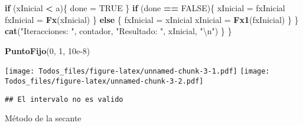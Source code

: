 \documentclass[]{article}
\newenvironment{Shaded}{\begin{snugshade}}{\end{snugshade}}
\newcommand{\CharTok}[1]{\textcolor[rgb]{0.31,0.60,0.02}{#1}}
\newcommand{\ControlFlowTok}[1]{\textcolor[rgb]{0.13,0.29,0.53}{\textbf{#1}}}
\newcommand{\DecValTok}[1]{\textcolor[rgb]{0.00,0.00,0.81}{#1}}
\newcommand{\FloatTok}[1]{\textcolor[rgb]{0.00,0.00,0.81}{#1}}
\newcommand{\KeywordTok}[1]{\textcolor[rgb]{0.13,0.29,0.53}{\textbf{#1}}}
\newcommand{\NormalTok}[1]{#1}
\newcommand{\OperatorTok}[1]{\textcolor[rgb]{0.81,0.36,0.00}{\textbf{#1}}}
\newcommand{\OtherTok}[1]{\textcolor[rgb]{0.56,0.35,0.01}{#1}}
\newcommand{\StringTok}[1]{\textcolor[rgb]{0.31,0.60,0.02}{#1}}
\begin{document}
\begin{Shaded}
\begin{Highlighting}[]
      \ControlFlowTok{if}\NormalTok{ (xInicial }\OperatorTok{<}\StringTok{ }\NormalTok{a)\{}
\NormalTok{        done =}\StringTok{ }\OtherTok{TRUE}
\NormalTok{      \}}
      \ControlFlowTok{if}\NormalTok{ (done }\OperatorTok{==}\StringTok{ }\OtherTok{FALSE}\NormalTok{)\{}
\NormalTok{        xInicial =}\StringTok{ }\NormalTok{fxInicial}
\NormalTok{        fxInicial =}\StringTok{ }\KeywordTok{Fx}\NormalTok{(xInicial)}
\NormalTok{      \} }\ControlFlowTok{else}\NormalTok{ \{}
\NormalTok{        fxInicial =}\StringTok{ }\NormalTok{xInicial}
\NormalTok{        xInicial =}\StringTok{ }\KeywordTok{Fx1}\NormalTok{(fxInicial)}
\NormalTok{      \}}
\NormalTok{    \}}
   \KeywordTok{cat}\NormalTok{(}\StringTok{"Iteracciones: "}\NormalTok{, contador, }\StringTok{"Resultado: "}\NormalTok{, xInicial, }\StringTok{"}\CharTok{\textbackslash{}n}\StringTok{"}\NormalTok{) }
\NormalTok{  \}}
\NormalTok{\}}

\KeywordTok{PuntoFijo}\NormalTok{(}\DecValTok{0}\NormalTok{, }\DecValTok{1}\NormalTok{, }\FloatTok{10e-8}\NormalTok{)}
\end{Highlighting}
\end{Shaded}

\texttt{[image: Todos\_files/figure-latex/unnamed-chunk-3-1.pdf]}
\texttt{[image: Todos\_files/figure-latex/unnamed-chunk-3-2.pdf]}

\begin{verbatim}
## El intervalo no es valido
\end{verbatim}

Método de la secante
\end{document}
